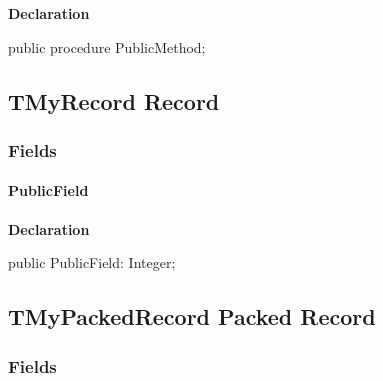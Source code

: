 \documentclass{report}
\begin{document}
\begin{list}{}{
\setlength{\itemindent}{0cm}
\setlength{\listparindent}{0cm}
\setlength{\leftmargin}{\evensidemargin}
\addtolength{\leftmargin}{\tmplength}
\settowidth{\labelsep}{X}
\addtolength{\leftmargin}{\labelsep}
\setlength{\labelwidth}{\tmplength}
}
\begin{flushleft}
\item[\textbf{Declaration}\hfill]
\begin{ttfamily}
public procedure PublicMethod;\end{ttfamily}


\end{flushleft}
\end{list}
\subsection*{TMyRecord Record}
\subsubsection*{\large{\textbf{Fields}}\normalsize\hspace{1ex}\hfill}
\paragraph*{PublicField}\hspace*{\fill}

\begin{list}{}{
\setlength{\itemindent}{0cm}
\setlength{\listparindent}{0cm}
\setlength{\leftmargin}{\evensidemargin}
\addtolength{\leftmargin}{\tmplength}
\settowidth{\labelsep}{X}
\addtolength{\leftmargin}{\labelsep}
\setlength{\labelwidth}{\tmplength}
}
\begin{flushleft}
\item[\textbf{Declaration}\hfill]
\begin{ttfamily}
public PublicField: Integer;\end{ttfamily}


\end{flushleft}
\end{list}
\subsection*{TMyPackedRecord Packed Record}
\subsubsection*{\large{\textbf{Fields}}\normalsize\hspace{1ex}\hfill}
\end{document}
